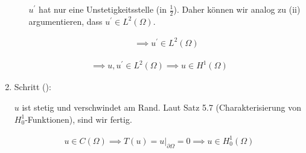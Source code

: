 \begin{solution}
\begin{enumerate}[label = \arabic*.]
\begin{enumerate}[label = (\roman*)]
    $u^\prime$ hat nur eine Unstetigkeitsstelle (in $\frac{1}{2}$).
    Daher können wir analog zu (ii) argumentieren, dass $u^\prime \in L^2(\Omega)$.

    \begin{align*}
      \implies
      u^\prime \in L^2(\Omega)
    \end{align*}

  \end{enumerate}

  \begin{align*}
    \implies
    u, u^\prime \in L^2(\Omega)
    \implies
    u \in H^1(\Omega)
  \end{align*}

  \item Schritt ():

  $u$ ist stetig und verschwindet am Rand.
  Laut Satz 5.7 (Charakterisierung von $H_0^1$-Funktionen), sind wir fertig.

  \begin{align*}
    u \in C(\Omega)
    \implies
    T(u) = u |_{\partial \Omega} = 0
    \implies
    u \in H_0^1(\Omega)
  \end{align*}

\end{enumerate}

\end{solution}

